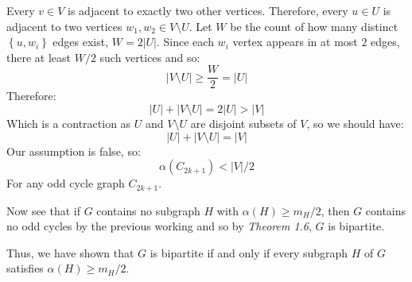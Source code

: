 \documentclass[a4paper, 11pt]{article}
\def\set#1{\left\{ #1 \right\}}
\begin{document}
\begin{multicols*}{2}
\begin{mdframed}
		Every $v\in V$ is adjacent to exactly two other vertices. Therefore, every $u\in U$ is adjacent to two vertices $w_1,w_2\in V\setminus U$. Let $W$ be the count of how many distinct $\set{u,w_i}$ edges exist, $W=2|U|$. Since each $w_i$ vertex appears in at most $2$ edges, there at least $W/2$ such vertices and so:
		$$|V\setminus U|\geq \frac W2 = |U|$$
		Therefore:
		$$|U|+|V\setminus U|=2|U|>|V|$$
		Which is a contraction as $U$ and $V\setminus U$ are disjoint subsets of $V$, so we should have:
		$$|U|+|V\setminus U|=|V|$$
		Our assumption is false, so:
		$$\alpha(C_{2k+1})<|V|/2$$
		For any odd cycle graph $C_{2k+1}$.

		Now see that if $G$ contains no subgraph $H$ with $\alpha(H)\geq m_H/2$, then $G$ contains no odd cycles by the previous working and so by \textit{Theorem 1.6}, $G$ is bipartite.
	\end{mdframed}

	Thus, we have shown that $G$ is bipartite if and only if every subgraph $H$ of $G$ satisfies $\alpha(H)\geq m_H/2$.



\end{multicols*}
\end{document}
